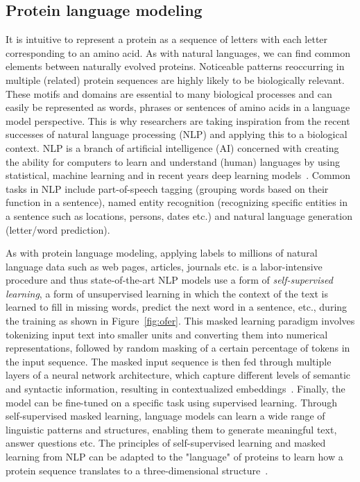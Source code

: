 \subsection*{Protein language modeling}\label{ssec:nlp}
It is intuitive to represent a protein as a sequence of letters with each letter corresponding to an amino acid. As with natural languages, we can find common elements between naturally evolved proteins. Noticeable patterns reoccurring in multiple (related) protein sequences are highly likely to be biologically relevant. These motifs and domains are essential to many biological processes and can easily be represented as words, phrases or sentences of amino acids in a language model perspective. This is why researchers are taking inspiration from the recent successes of natural language processing (NLP) and applying this to a biological context. NLP is a branch of artificial intelligence (AI) concerned with creating the ability for computers to learn and understand (human) languages by using statistical, machine learning and in recent years deep learning models~\cite{Ofer}. Common tasks in NLP include part-of-speech tagging (grouping words based on their function in a sentence), named entity recognition (recognizing specific entities in a sentence such as locations, persons, dates etc.) and natural language generation (letter/word prediction).

As with protein language modeling, applying labels to millions of natural language data such as web pages, articles, journals etc. is a labor-intensive procedure and thus state-of-the-art NLP models use a form of \textit{self-supervised learning}, a form of unsupervised learning in which the context of the text is learned to fill in missing words, predict the next word in a sentence, etc., during the training as shown in Figure~\ref{fig:ofer}. This masked learning paradigm involves tokenizing input text into smaller units and converting them into numerical representations, followed by random masking of a certain percentage of tokens in the input sequence. The masked input sequence is then fed through multiple layers of a neural network architecture, which capture different levels of semantic and syntactic information, resulting in contextualized embeddings~\cite{esm}. Finally, the model can be fine-tuned on a specific task using supervised learning. Through self-supervised masked learning, language models can learn a wide range of linguistic patterns and structures, enabling them to generate meaningful text, answer questions etc. The principles of self-supervised learning and masked learning from NLP can be adapted to the "language" of proteins to learn how a protein sequence translates to a three-dimensional structure~\cite{review}.

